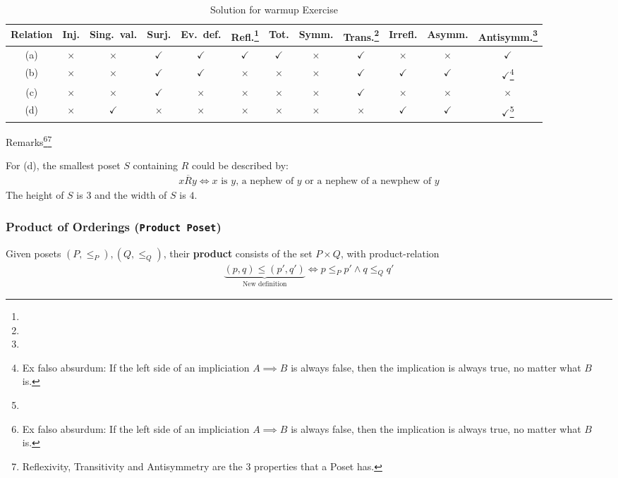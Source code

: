 \begin{table}[h]
\centering
\begin{tabular}{c|ccccccccccc}
  Relation 
  & Inj. & Sing.\ val. & Surj. & Ev.\ def. & Refl.\footnote[2]{} & Tot. & Symm. & Trans.\footnote[2]{} & Irrefl. & Asymm. & Antisymm.\footnote[2]{}\\
  \midrule
  (a)
  & $\times$ & $\times$ & $\checkmark$ & $\checkmark$ & $\checkmark$ & $\checkmark$ & $\times$ & $\checkmark$ & $\times$ & $\times$ & $\checkmark$
  \\
  (b)
  & $\times$ & $\times$ & $\checkmark$ & $\checkmark$ & $\times$ & $\times$ & $\times$ & $\checkmark$ & $\checkmark$ & $\checkmark$ & $\checkmark$\footnote[1]{Ex falso absurdum: If the left side of an impliciation $A \implies B$ is always false, then the implication is always true, no matter what $B$ is.}
  \\
  (c)
  & $\times$ & $\times$ & $\checkmark$ & $\times$
  & $\times$ & $\times$ & $\times$ & $\checkmark$ 
  & $\times$ & $\times$ & $\times$
  \\
  (d)
  & $\times$ & $\checkmark$ & $\times$ & $\times$ & $\times$ & $\times$ & $\times$ & $\times$ & $\checkmark$ & $\checkmark$ & $\checkmark$\footnote[1]{}
\end{tabular}
\caption{Solution for warmup Exercise}
\end{table}
Remarks\footnote[1]{Ex falso absurdum: If the left side of an impliciation $A \implies B$ is always false, then the implication is always true, no matter what $B$ is.}\footnote[2]{Reflexivity, Transitivity and Antisymmetry are the 3 properties that a Poset has.}

For (d),  the smallest poset $S$ containing $R$ could be described by:
\begin{align*}
  x \overline{R} y \iff
  \text{$x$ is $y$, a nephew of $y$ or a nephew of a newphew of $y$}
\end{align*}
The height of $S$ is $3$ and the width of $S$ is $4$.


\subsubsection{Product of Orderings (\texttt{Product Poset})}

Given posets $(P,\leq_P), (Q,\leq_Q)$, their \textbf{product} consists of the set $P \times Q$, with product-relation
\begin{align*}
  \underbrace{(p,q) \leq (p',q')}_{\text{New definition}} \iff p \leq_P p' \land q \leq_Q q'
\end{align*}

